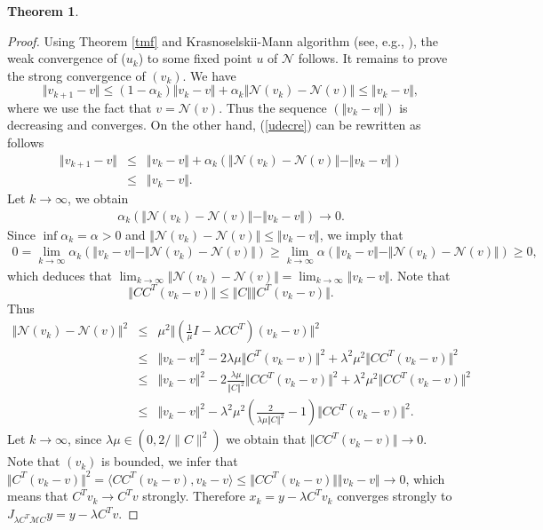 \documentclass[11pt]{article}
\def\beq{\begin{equation}}
\def\eeq{\end{equation}}
\def\baq{\begin{eqnarray}}
\def\eaq{\end{eqnarray}}
\def\baqn{\begin{eqnarray*}}
\def\eaqn{\end{eqnarray*}}
\theoremstyle{plain}
\newtheorem{theorem}{Theorem}
\begin{document}
{{\begin{theorem}
\end{theorem}
}
\begin{proof}
Using Theorem  \ref{tmf} and Krasnoselskii-Mann algorithm (see, e.g., \cite{Bauschke}), the weak convergence of ($u_k$) to some  fixed point $u$ of $\mathcal{N}$ follows. It remains to prove the strong convergence of $(v_k)$. We have 
\beq\label{udecre}
\Vert v_{k+1}-v\Vert\le(1-\alpha_k) \Vert v_{k}-v\Vert+\alpha_k\Vert \mathcal{N}(v_k)-\mathcal{N}(v)\Vert\le \Vert v_{k}-v\Vert,
\eeq
 where we use the fact that  $v=\mathcal{N}(v)$. Thus the sequence $( \Vert v_{k}-v\Vert)$ is decreasing and converges. On the other hand,  (\ref{udecre}) can be rewritten as follows
 \baqn
 \Vert v_{k+1}-v\Vert 
 & \le&  \Vert v_{k}-v\Vert+\alpha_k(\Vert \mathcal{N}(v_k)-\mathcal{N}(v)\Vert- \Vert v_{k}-v\Vert)\\
 &\le&  \Vert v_{k}-v\Vert.
 \eaqn
{Let $k\to \infty$, we obtain 
\baq
\alpha_k(\Vert \mathcal{N}(v_k)-\mathcal{N}(v)\Vert- \Vert v_{k}-v\Vert)\to 0.
\eaq
Since $\inf \alpha_k =\alpha> 0$ and $\Vert \mathcal{N}(v_k)-\mathcal{N}(v)\Vert\le \Vert v_{k}-v\Vert$, we imply that
\baq
0=\lim_{k\to \infty}\alpha_k( \Vert v_{k}-v\Vert-\Vert \mathcal{N}(v_k)-\mathcal{N}(v)\Vert)\ge \lim_{k\to \infty}\alpha( \Vert v_{k}-v\Vert-\Vert \mathcal{N}(v_k)-\mathcal{N}(v)\Vert)\ge 0,
\eaq
which deduces that $ \lim_{k\to \infty}\Vert \mathcal{N}(v_k)-\mathcal{N}(v)\Vert= \lim_{k\to \infty} \Vert v_{k}-v\Vert.$
Note that
$$
\Vert CC^T(v_k-v)\Vert \le \Vert C \Vert \Vert C^T(v_k-v)\Vert. 
$$
Thus 
\baqn
 \Vert \mathcal{N}(v_k)-\mathcal{N}(v)\Vert^2&\le& {\mu^2}\Vert (\frac{1}{\mu} I-\lambda CC^T)(v_k-v)\Vert^2\\
  &\le& \Vert v_{k}-v\Vert^2- 2 {\lambda}{\mu} \Vert C^T(v_k-v)\Vert^2 + {\lambda^2}{\mu^2}\Vert CC^T(v_k-v)\Vert^2\\
   &\le& \Vert v_{k}-v\Vert^2-  2 \frac{\lambda\mu}{ \Vert C \Vert^2}\Vert CC^T(v_k-v)\Vert^2+ {\lambda^2}{\mu^2}\Vert CC^T(v_k-v)\Vert^2\\
 &\le& \Vert v_{k}-v\Vert^2-{\lambda^2}{\mu^2}(\frac{2}{\lambda\mu\Vert C\Vert^2}-1)\Vert CC^T(v_k-v)\Vert^2.
\eaqn
Let $k\to \infty$, since ${\lambda}{\mu} \in (0, 2/\|C\|^2)$ we obtain that $\Vert CC^T(v_k-v)\Vert\to 0$. \\
Note that $(v_k)$ is bounded, we infer that $\Vert C^T(v_k-v)\Vert^2=\langle CC^T(v_k-v), v_k-v \rangle\le   \Vert CC^T(v_k-v)\Vert \Vert  v_k-v \Vert \to 0$, {which means that $C^Tv_k\to C^Tv$ strongly}. Therefore $x_k= y - \lambda C^T v_k$ converges strongly to $J_{\lambda C^T\mathcal{M}C}y=y-\lambda C^T v$.}

\end{proof}}
\end{document}
